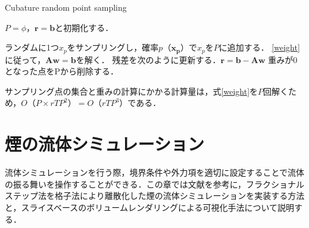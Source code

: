 \documentclass[a4j,12pt]{jreport}
\begin{document}
\begin{algorithm}[H]
    	\caption{Cubature random point sampling}
	\label{alg1}
        	\begin{algorithmic}[1]
		\STATE $P = \phi$，$\bm{r} = \bm{b}$と初期化する．                
		
			\STATE ランダムに1つ$x_p$をサンプリングし，確率$p（\bm{x_p}）$で$x_p$を$P$に追加する．
			\STATE \ref{weight}に従って，$\mathbf{A}\bm{w} = \bm{b}$を解く．
			\STATE 残差を次のように更新する．$\bm{r} = \bm{b} - \mathbf{A}\bm{w}$
			\STATE 重みが0となった点をPから削除する．
		\ENDWHILE
        \end{algorithmic}
\end{algorithm}

サンプリング点の集合と重みの計算にかかる計算量は，式\ref{weight}を$P$回解くため，$O（P\times rTP^2） = O（rTP^3）$である．
\chapter{煙の流体シミュレーション}
流体シミュレーションを行う際，境界条件や外力項を適切に設定することで流体の振る舞いを操作することができる．この章では文献\cite{fedkiw}を参考に，フラクショナルステップ法を格子法により離散化した煙の流体シミュレーションを実装する方法と，スライスベースのボリュームレンダリングによる可視化手法について説明する．%
\end{document}
